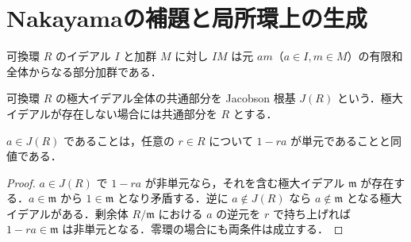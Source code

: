 \section{Nakayamaの補題と局所環上の生成}
\begin{defn}[イデアルと加群の積]
可換環 $R$ のイデアル $I$ と加群 $M$ に対し $IM$ は元 $am$（$a\in I,m\in M$）の有限和全体からなる部分加群である．
\end{defn}
\begin{defn}[Jacobson根基]
可換環 $R$ の極大イデアル全体の共通部分を Jacobson 根基 $J(R)$ という．極大イデアルが存在しない場合には共通部分を $R$ とする．
\end{defn}
\begin{prop}[Jacobson根基の単元判定]
$a\in J(R)$ であることは，任意の $r\in R$ について $1-ra$ が単元であることと同値である．
\end{prop}
\begin{proof}
$a\in J(R)$ で $1-ra$ が非単元なら，それを含む極大イデアル $\mathfrak m$ が存在する．$a\in\mathfrak m$ から $1\in\mathfrak m$ となり矛盾する．逆に $a\notin J(R)$ なら $a\notin\mathfrak m$ となる極大イデアルがある．剰余体 $R/\mathfrak m$ における $a$ の逆元を $r$ で持ち上げれば $1-ra\in\mathfrak m$ は非単元となる．零環の場合にも両条件は成立する．
\end{proof}
